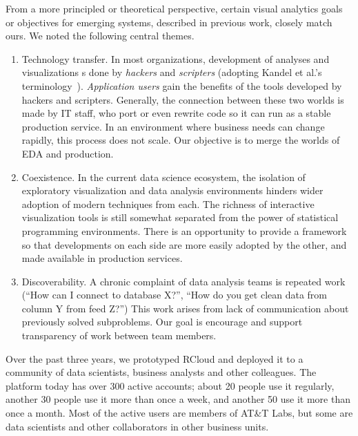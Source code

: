 From a more principled or theoretical perspective, certain visual analytics
goals or objectives for emerging systems, described in previous work,
closely match ours. We noted the following central themes.

\begin{enumerate}

\item Technology transfer.
In most organizations, development of analyses and visualizations 
s done by \emph{hackers} and \emph{scripters} (adopting Kandel et al.'s
terminology~\cite{Kandel:2012:EDA}). \emph{Application users} 
gain the benefits of the tools developed by hackers and scripters.
Generally, the connection between these two worlds is made by IT staff,
who port or even rewrite code so it can run as a stable production service.
In an environment where business needs can change rapidly, this
process does not scale. Our objective is to merge the worlds
of EDA and production.

\item Coexistence. In the current data science ecosystem, the
isolation of exploratory visualization and data analysis
environments hinders wider adoption of modern techniques from each.
The richness of interactive visualization tools is still somewhat
separated from the power of statistical programming environments.
There is an opportunity to provide a framework so that developments
on each side are more easily adopted by the other, and made available
in production services.

\item Discoverability. A chronic complaint of data analysis teams is
repeated work (``How can I connect to database X?'', ``How do you get
clean data from column Y from feed Z?'') This work arises from lack of
communication about previously solved subproblems. Our goal is encourage
and support transparency of work between team members.

\end{enumerate}

Over the past three years, we prototyped RCloud and deployed it to
a community of data scientists, business analysts and other colleagues.  The
platform today has over 300 active accounts; about 20 people use it regularly,
another 30 people use it more than once a week, and another 50 use it more than
once a month.  Most of the
active users are members of AT\&T Labs, but some are data scientists and other
collaborators in other business units.

